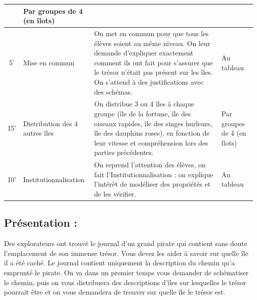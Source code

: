 \documentclass[12pt, a4paper]{article}
\begin{document}
\begin{longtable}{c|m{3.9cm}|m{8.4cm}|m{2.4cm}}
		& Par groupes de 4 (en îlots)
		
		\\ \hline
		
		5' &
		
	  Mise en commun
		
		&
		
    On met en commun pour que tous les élèves soient au même niveau.
    On leur demande d'expliquer exactement comment ils ont fait pour s'assurer que le trésor n'était pas présent sur les îles.
    On s'attend à des justifications avec des schémas.
		
		&
		
    Au tableau
		
		\\ \hline
		
		15'
		
		&
		
		Distribution des 4 autres îles

		&
		
    On distribue 3 ou 4 îles à chaque groupe (île de la fortune, île des oiseaux rapides,
    île des singes hurleurs, île des dauphins roses), en fonction de leur vitesse et compréhension lors des parties précédentes.
		
		&
		
		Par groupes de 4 (en îlots)

    \\ \hline

    10'

    &

    Institutionnalisation

    &

    On reprend l'attention des élèves, on fait l'Institutionnalisation : on explique l'intérêt de modéliser des propriétés et de les vérifier.
		
    &

    Au tableau

	\end{longtable}
	
\subsection*{Présentation :}
Des explorateurs ont trouvé le journal d’un grand pirate qui contient sans doute l’emplacement de son immense trésor. Vous devez les aider à
savoir sur quelle île il a été caché. Le journal contient uniquement la description du chemin qu’a emprunté le pirate. On va dans un premier
temps vous demander de schématiser le chemin, puis on vous distribuera des descriptions d’îles sur lesquelles le trésor pourrait être et on
vous demandera de trouver sur quelle île le trésor est.
\end{document}
